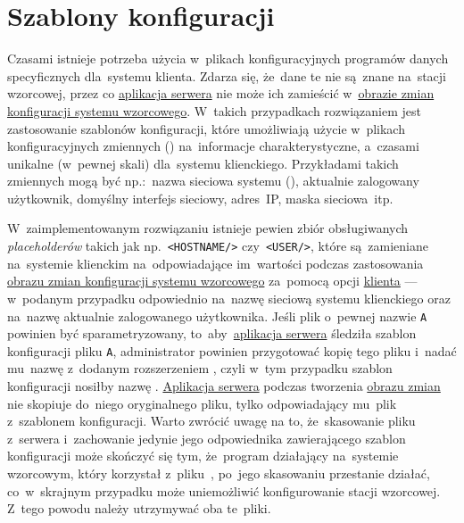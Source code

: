 \documentclass[thesis]{subfiles}
\begin{document}

\section{Szablony konfiguracji}
\label{sec:szablony-konfiguracji}

Czasami istnieje potrzeba użycia w~plikach konfiguracyjnych programów danych specyficznych dla~systemu klienta. Zdarza się, że~dane te nie są~znane na~stacji wzorcowej, przez co \hyperref[sec:srv-app]{aplikacja serwera} nie może ich zamieścić w~\hyperref[sec:obraz-zmian-konfiguracji]{obrazie zmian konfiguracji systemu wzorcowego}. W~takich przypadkach rozwiązaniem jest zastosowanie szablonów konfiguracji, które umożliwiają użycie w~plikach konfiguracyjnych zmiennych () na~informacje charakterystyczne, a~czasami unikalne (w~pewnej skali) dla~systemu klienckiego. Przykładami takich zmiennych  mogą być np.:~nazwa sieciowa systemu (), aktualnie zalogowany użytkownik, domyślny interfejs sieciowy, adres~IP, maska sieciowa~itp.

W~zaimplementowanym rozwiązaniu istnieje pewien zbiór obsługiwanych \emph{placeholderów} takich jak np.~\texttt{<HOSTNAME/>} czy~\texttt{<USER/>}, które są~zamieniane na~systemie klienckim na~odpowiadające im~wartości podczas zastosowania \hyperref[sec:obraz-zmian-konfiguracji]{obrazu zmian konfiguracji systemu wzorcowego} za~pomocą opcji \hyperref[sec:cli-app]{klienta}  --- w~podanym przypadku odpowiednio na~nazwę sieciową systemu klienckiego oraz na~nazwę aktualnie zalogowanego użytkownika. Jeśli plik o~pewnej nazwie \texttt{A} powinien być sparametryzowany, to~aby~\hyperref[sec:srv-app]{aplikacja serwera} śledziła szablon konfiguracji pliku \texttt{A}, administrator powinien przygotować kopię tego pliku i~nadać mu~nazwę z~dodanym rozszerzeniem , czyli w~tym przypadku szablon konfiguracji nosiłby nazwę . \hyperref[sec:srv-app]{Aplikacja serwera} podczas tworzenia \hyperref[sec:obraz-zmian-konfiguracji]{obrazu zmian} nie skopiuje do~niego oryginalnego pliku, tylko odpowiadający mu~plik z~szablonem konfiguracji. Warto zwrócić uwagę na to, że~skasowanie pliku  z~serwera i~zachowanie jedynie jego odpowiednika zawierającego szablon konfiguracji może skończyć się tym, że~program działający na~systemie wzorcowym, który korzystał z~pliku~, po~jego skasowaniu przestanie działać, co~w~skrajnym przypadku może uniemożliwić konfigurowanie stacji wzorcowej. Z~tego powodu należy utrzymywać oba te~pliki.
\end{document}
